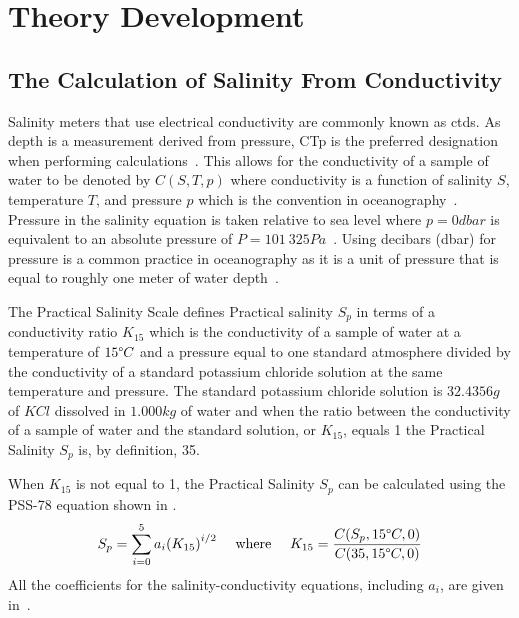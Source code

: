 
\chapter{Theory Development}\label{ch:theory-development}

\section{The Calculation of Salinity From Conductivity}\label{sec:salinity-conductivity-relationship}

Salinity meters that use electrical conductivity are commonly known as \glspl{ctd}.
As depth is a measurement derived from pressure, CTp is the preferred designation when performing calculations~\cite{lewis_salinity_definition_and_calculation_1978}.
This allows for the conductivity of a sample of water to be denoted by $C(S, T, p)$ where conductivity is a function of salinity $S$, temperature $T$, and pressure $p$ which is the convention in oceanography~\cite{lewis_salinity_definition_and_calculation_1978}.
Pressure in the salinity equation is taken relative to sea level where $p = 0 dbar$ is equivalent to an absolute pressure of $P = 101\ 325 Pa$~\cite{ioc_teos_2010}.
Using decibars (dbar) for pressure is a common practice in oceanography as it is a unit of pressure that is equal to roughly one meter of water depth~\cite{seabird_dbar_to_depth_2024}.

The Practical Salinity Scale defines Practical salinity $S_p$ in terms of a conductivity ratio $K_{15}$ which is the conductivity of a sample of water at a temperature of $15\degree C$ and a pressure equal to one standard atmosphere divided by the conductivity of a standard potassium chloride solution at the same temperature and pressure.
The standard potassium chloride solution is $32.4356g$ of $KCl$ dissolved in $1.000kg$ of water and when the ratio between the conductivity of a sample of water and the standard solution, or $K_{15}$, equals 1 the Practical Salinity $S_p$ is, by definition, 35.~\cite{ioc_teos_2010}

When $K_{15}$ is not equal to 1, the Practical Salinity $S_p$ can be calculated using the PSS-78 equation shown in .
\begin{equation}\label{eqn:pss-78-k15}
    S_p = \sum_{i=0}^{5} a_i {(K_{15})}^{i/2}~~~~\text{where}~~~~K_{15} = \frac{C(S_p, 15\degree C, 0)}{C(35, 15\degree C, 0)}
\end{equation}
All the coefficients for the salinity-conductivity equations, including $a_i$, are given in~.

